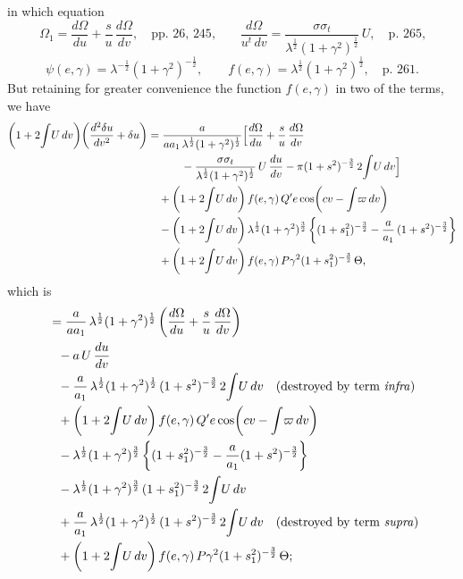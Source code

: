\documentclass[11pt]{article}
\begin{document}
in which equation
\[
\Omega_{1} = \frac{d\Omega}{du} + \frac{s}{u}\,\frac{d\Omega}{dv},
\quad \text{pp.\ $26$, $245$,} \qquad
\frac{d\Omega}{u^{t}\,dv} = \frac{\sigma\sigma_{t}}{\lambda^{\frac{1}{2}}(1+\gamma^{2})^{\frac{1}{2}}}\, U,
\quad \text{p.\ $265$,}
\]
\[
\psi(e,\gamma) = \lambda^{-\frac{1}{2}}(1+\gamma^{2})^{-\frac{1}{2}}, \qquad
f(e,\gamma) = \lambda^{\frac{1}{2}}(1+\gamma^{2})^{\frac{1}{2}}, \quad \text{p.\ $261$.}
\]
But retaining for greater convenience the function $f(e,\gamma)$ in
two of the terms, we have
\begin{align*}
\left(1 + 2\!\int\!U\,dv\right)\!\left(\frac{d^{2}\delta u}{dv^{2}} + \delta u\right)
&= \frac{a}{a a_{1}\,\lambda^{\frac{1}{2}}(1+\gamma^{2})^{\frac{1}{2}}}
\Big[\frac{d\Omega}{du} + \frac{s}{u}\,\frac{d\Omega}{dv} \\
&\hphantom{={}}\qquad
   - \frac{\sigma\sigma_{t}}{\lambda^{\frac{1}{2}}(1+\gamma^{2})^{\frac{1}{2}}}\, U\,\frac{du}{dv}
   - \pi(1+s^{2})^{-\frac{3}{2}}\, 2\!\int\!U\,dv \Big]\\
&\quad + \left(1 + 2\!\int\!U\,dv\right) f(e,\gamma)\, Q'e\cos\!\left(cv - \int\!\varpi\,dv\right)\\
&\quad - \left(1 + 2\!\int\!U\,dv\right) \lambda^{\frac{1}{2}}(1+\gamma^{2})^{\frac{3}{2}}
\left\{(1+s_{1}^{2})^{-\frac{3}{2}} - \frac{a}{a_{1}}\,(1+s^{2})^{-\frac{3}{2}}\right\}\\
&\quad + \left(1 + 2\!\int\!U\,dv\right) f(e,\gamma)\, P\gamma^{2}(1+s_{1}^{2})^{-\frac{3}{2}}\,\Theta,
\end{align*}
which is
\begin{align*}
&\;= \frac{a}{a a_{1}}\,\lambda^{\frac{1}{2}}(1+\gamma^{2})^{\frac{1}{2}}
\left(\frac{d\Omega}{du} + \frac{s}{u}\,\frac{d\Omega}{dv}\right) \\
&\quad - a\, U\,\frac{du}{dv} \\
&\quad - \frac{a}{a_{1}}\,\lambda^{\frac{1}{2}}(1+\gamma^{2})^{\frac{1}{2}}\,(1+s^{2})^{-\frac{3}{2}}\, 2\!\int\!U\,dv
   \quad \text{(destroyed by term \textit{infra})}\\
&\quad + \left(1 + 2\!\int\!U\,dv\right) f(e,\gamma)\, Q'e\cos\!\left(cv - \int\!\varpi\,dv\right) \\
&\quad - \lambda^{\frac{1}{2}}(1+\gamma^{2})^{\frac{3}{2}}
\left\{(1+s_{1}^{2})^{-\frac{3}{2}} - \frac{a}{a_{1}}(1+s^{2})^{-\frac{3}{2}}\right\} \\
&\quad - \lambda^{\frac{1}{2}}(1+\gamma^{2})^{\frac{3}{2}}\,(1+s_{1}^{2})^{-\frac{3}{2}}\, 2\!\int\!U\,dv \\
&\quad + \frac{a}{a_{1}}\,\lambda^{\frac{1}{2}}(1+\gamma^{2})^{\frac{1}{2}}\,(1+s^{2})^{-\frac{3}{2}}\, 2\!\int\!U\,dv
   \quad \text{(destroyed by term \textit{supra})}\\
&\quad + \left(1 + 2\!\int\!U\,dv\right) f(e,\gamma)\, P\gamma^{2}(1+s_{1}^{2})^{-\frac{3}{2}}\,\Theta;
\end{align*}
\end{document}
